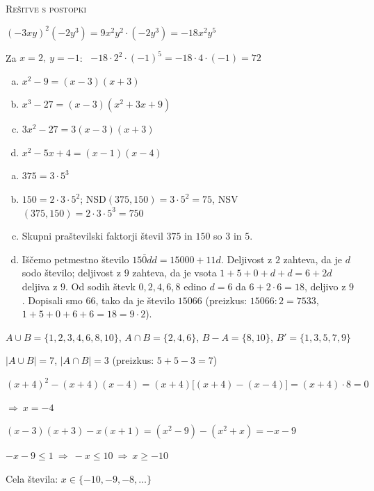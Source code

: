 \documentclass[a4paper,12pt]{letter}
\newcommand{\mn}[1]{\{#1\}}
\newcommand{\moc}[1]{|#1|}
\begin{document}
\newpage
\textsc{\Large Re\v{s}itve s postopki}
\vspace{0.5cm}

\begin{resitev}[-- Potence]
$(-3xy)^2(-2y^3)=9x^2y^2\cdot(-2y^3)=-18x^2y^5$

Za $x=2,\ y=-1$: \ $-18\cdot2^2\cdot(-1)^5=-18\cdot4\cdot(-1)=72$
\end{resitev}

\begin{resitev}
\begin{enumerate}[a)]
\item $x^2-9=(x-3)(x+3)$
\item $x^3-27=(x-3)(x^2+3x+9)$
\item $3x^2-27=3(x-3)(x+3)$
\item $x^2-5x+4=(x-1)(x-4)$
\end{enumerate}
\end{resitev}

\begin{resitev}
\begin{enumerate}[a)]
\item $375=3\cdot5^3$
\item $150=2\cdot3\cdot5^2$; \quad NSD$(375,150)=3\cdot5^2=75$, \quad NSV$(375,150)=2\cdot3\cdot5^3=750$
\item Skupni pra\v{s}tevilski faktorji \v{s}tevil $375$ in $150$ so $3$ in $5$.
\item I\v{s}\v{c}emo petmestno \v{s}tevilo $\overline{150dd}=15000+11d$. Deljivost z $2$ zahteva, da je $d$ sodo \v{s}tevilo;
deljivost z $9$ zahteva, da je vsota $1+5+0+d+d=6+2d$ deljiva z $9$. Od sodih \v{s}tevk $0,2,4,6,8$ edino
$d=6$ da $6+2\cdot6=18$, deljivo z $9$. Dopisali smo \textbf{$66$}, tako da je \v{s}tevilo $15066$
(preizkus: $15066:2=7533$, $1+5+0+6+6=18=9\cdot2$).
\end{enumerate}
\end{resitev}

\begin{resitev}
$A\cup B=\mn{1,2,3,4,6,8,10}$, \quad $A\cap B=\mn{2,4,6}$, \quad $B-A=\mn{8,10}$, \quad $B'=\mn{1,3,5,7,9}$

$\moc{A\cup B}=7$, \quad $\moc{A\cap B}=3$ \quad (preizkus: $5+5-3=7$)
\end{resitev}

\begin{resitev}[-- Ena\v{c}ba]
$(x+4)^2-(x+4)(x-4)=(x+4)\big[(x+4)-(x-4)\big]=(x+4)\cdot8=0$

$\Rightarrow\ x=-4$
\end{resitev}

\begin{resitev}[-- Neena\v{c}ba]
$(x-3)(x+3)-x(x+1)=(x^2-9)-(x^2+x)=-x-9$

$-x-9\le1\ \Rightarrow\ -x\le10\ \Rightarrow\ x\ge-10$

Cela \v{s}tevila: $x\in\{-10,-9,-8,\dots\}$
\end{resitev}
\end{document}

